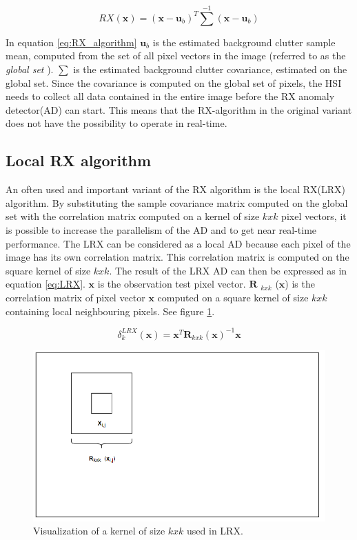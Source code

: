 \begin{equation}
    RX(\textbf{x}) = (\textbf{x} - \textbf{u}_b)^T \sum^{-1} (\textbf{x} - \textbf{u}_b)	
\label{eq:RX_algorithm}
\end{equation}

In equation \ref{eq:RX_algorithm} $\textbf{u}_b$ is the estimated background clutter sample mean, computed from the set of all pixel vectors in the image (referred to as the \textit{global set}  ). $\sum$ is the estimated background clutter covariance, estimated on the global set. Since the covariance is computed on the global set of pixels, the HSI needs to collect all data contained in the entire image before the RX anomaly detector(AD) can start. This means that the RX-algorithm in the original variant does not have the possibility to operate in real-time. 

\subsection{Local RX algorithm}
\label{sec:LRX_theory}
An often used and important variant of the RX algorithm is the local RX(LRX) algorithm. By substituting the sample covariance matrix computed on the global set with the correlation matrix computed on a kernel of size $k x k$ pixel vectors, it is possible to increase the parallelism of the AD and to get near real-time performance. The LRX can be considered as a local AD because each pixel of the image has its own correlation matrix. This correlation matrix is computed on the square kernel of size $k x k$. The result of the LRX AD can then be expressed as in equation \ref{eq:LRX}. $\textbf{x}$ is the observation test pixel vector. $\textbf{R}$ $_{k x k}$ ($\textbf{x}$) is the correlation matrix of pixel vector $\textbf{x}$ computed on a square kernel of size $k x k$ containing local neighbouring pixels. See figure \ref{fig:LRX}. 

\begin{equation}
    \delta_k^{LRX}(\textbf{x}) = \textbf{x}^T\textbf{R}_{k x k}(\textbf{x})^{-1}\textbf{x}
    \label{eq:LRX}
\end{equation}


\begin{figure}[H]
\centering
   \includegraphics[scale=0.3]{images/LRX.PNG}
  \caption{ Visualization of a kernel of size $k x k$ used in LRX. } 
  \label{fig:LRX}
\end{figure}


